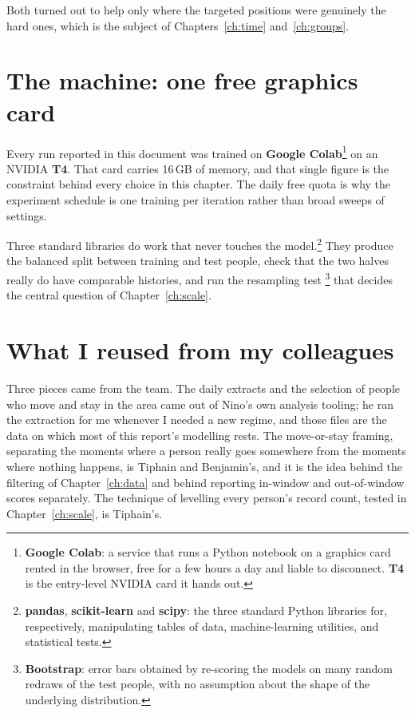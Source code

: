 Both turned out to help only where the targeted positions were genuinely the hard
ones, which is the subject of Chapters~\ref{ch:time} and~\ref{ch:groups}.

\section{The machine: one free graphics card}

Every run reported in this document was trained on \textbf{Google
Colab}\footnote{\textbf{Google Colab}: a service that runs a Python notebook on a
graphics card rented in the browser, free for a few hours a day and liable to
disconnect. \textbf{T4} is the entry-level NVIDIA card it hands out.} on an
NVIDIA \textbf{T4}. That card carries 16\,GB of memory, and that single figure is
the constraint behind every choice in this chapter. The daily free quota is why
the experiment schedule is one training per iteration rather than broad sweeps of
settings.

Three standard libraries do work that never touches the
model.\footnote{\textbf{pandas}, \textbf{scikit-learn} and \textbf{scipy}: the
three standard Python libraries for, respectively, manipulating tables of data,
machine-learning utilities, and statistical tests.} They produce the balanced
split between training and test people, check that the two halves really do have
comparable histories, and run the resampling test
\cite{efron1993bootstrap}\footnote{\textbf{Bootstrap}: error bars obtained by
re-scoring the models on many random redraws of the test people, with no
assumption about the shape of the underlying distribution.} that decides the
central question of Chapter~\ref{ch:scale}.

\section{What I reused from my colleagues}

Three pieces came from the team. The daily extracts and the selection of people
who move and stay in the area came out of Nino's own analysis tooling; he ran the
extraction for me whenever I needed a new regime, and those files are the data on
which most of this report's modelling rests. The move-or-stay framing, separating
the moments where a person really goes somewhere from the moments where nothing
happens, is Tiphain and Benjamin's, and it is the idea behind the filtering of
Chapter~\ref{ch:data} and behind reporting in-window and out-of-window scores
separately. The technique of levelling every person's record count, tested in
Chapter~\ref{ch:scale}, is Tiphain's.

